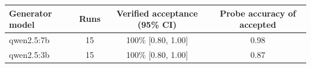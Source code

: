 \begin{tabular}{lccc}
\toprule
Generator model & Runs & Verified acceptance (95\% CI) & Probe accuracy of accepted \\
\midrule
qwen2.5:7b & 15 & 100\% [0.80, 1.00] & 0.98 \\
qwen2.5:3b & 15 & 100\% [0.80, 1.00] & 0.87 \\
\bottomrule
\end{tabular}
